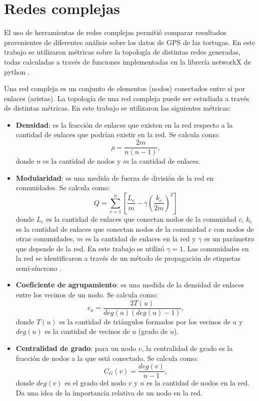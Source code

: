 \section{Redes complejas}
El uso de herramientas de redes complejas permitió comparar resultados provenientes de diferentes análisis sobre los datos de GPS de las tortugas. En este trabajo se utilizaron métricas sobre la topología de distintas redes generadas, todas calculadas a través de funciones implementadas en la librería networkX de python \cite{networkx}.
 
Una red compleja es un conjunto de elementos (nodos) conectados entre sí por enlaces (aristas). La topología de una red compleja puede ser estudiada a través de distintas métricas. En este trabajo se utilizaron las siguientes métricas:
\begin{itemize}
    \item \textbf{Densidad}: es la fracción de enlaces que existen en la red respecto a la cantidad de enlaces que podrían existir en la red. Se calcula como:
    \begin{equation}
        \rho = \frac{2m}{n(n-1)},
    \end{equation}
    donde $n$ es la cantidad de nodos y $m$ la cantidad de enlaces.
    \item  \textbf{Modularidad}: es una medida de fuerza de división de la red en comunidades. Se calcula como:
    \begin{equation}
        Q = \sum_{c=1}^{n}
        \left[ \frac{L_c}{m} - \gamma\left( \frac{k_c}{2m} \right) ^2 \right]
    \end{equation}
    donde $L_c$ es la cantidad de enlaces que conectan nodos de la comunidad $c$, $k_c$ es la cantidad de enlaces que conectan nodos de la comunidad $c$ con nodos de otras comunidades, $m$ es la cantidad de enlaces en la red y $\gamma$ es un parámetro que depende de la red. En este trabajo se utilizó $\gamma = 1$. Las comunidades en la red se identificaron a través de un método de propagación de etiquetas semi-síncrono \cite{cordasco2010community}.
    \item \textbf{Coeficiente de agrupamiento}: es una medida de la densidad de enlaces entre los vecinos de un nodo. Se calcula como:
    \begin{equation}
        c_u = \frac{2 T(u)}{deg(u)(deg(u)-1)},
    \end{equation}
    donde $T(u)$ es la cantidad de triángulos formados por los vecinos de $u$ y $deg(u)$ es la cantidad de vecinos de $u$ (grado de $u$).
 
   \item \textbf{Centralidad de grado}: para un nodo $v$, la centralidad de grado es la fracción de nodos a la que está conectado. Se calcula como:
    \begin{equation}
        C_G(v) = \frac{deg(v)}{n-1},
    \end{equation}
    donde $deg(v)$ es el grado del nodo $v$ y $n$ es la cantidad de nodos en la red. Da una idea de la importancia relativa de un nodo en la red.
 
\end{itemize}
 
 
 
 
 
 
 

